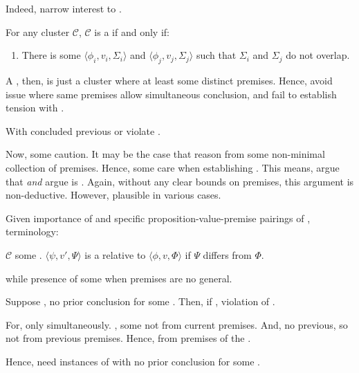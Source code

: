 \begin{note}
  Indeed, narrow interest to .

  \begin{definition}[\ragCluster{3}]
    For any cluster \(\mathcal{C}\), \(\mathcal{C}\) is a \emph{\ragCluster{}} if and only if:
    \begin{enumerate}
    \item
      There is some \(\langle \phi_{i},v_{i},\Sigma_{i} \rangle\) and \(\langle \phi_{j},v_{j},\Sigma_{j} \rangle\) such that \(\Sigma_{i}\) and \(\Sigma_{j}\) do not overlap.
    \end{enumerate}
    \vspace{-\baselineskip}
  \end{definition}

  A \ragCluster{}, then, is just a cluster where at least some distinct premises.
  Hence, avoid issue where same premises allow simultaneous conclusion, and fail to establish tension with \ESU{}.

  \begin{proposition}
    With \ragCluster{} concluded previous or violate \ESU{}.
  \end{proposition}

  Now, some caution.
  It may be the case that reason from some non-minimal collection of premises.
  Hence, some care when establishing \ragged{}.
  This means, argue that \cluster{} \emph{and} argue \cluster{} is \ragged{}.
  Again, without any clear bounds on premises, this argument is non-deductive.
  However, plausible in various cases.
\end{note}

\begin{note}
  Given importance of \ragged{} and specific proposition-value-premise pairings of \ragged{}, terminology:

  \begin{definition}
    \(\mathcal{C}\) some \ragCluster{}.
    \(\langle \psi,v',\Psi \rangle\) is a \emph{} relative to \(\langle \phi,v,\Phi \rangle\) if \(\Psi\) differs from \(\Phi\).
  \end{definition}

  \csN{} while presence of some \jag{} when premises are no general.
\end{note}

\begin{note}
  Suppose \ragged{}, no prior conclusion for some \jag{}.
  Then, if \csN{}, violation of \ESU{}.

  For, only \csN{} simultaneously.
  \jag{}, some not from current premises.
  And, no previous, so not from previous premises.
  Hence, \csN{} from premises of the \jag{}.

  Hence, need instances of \ragged{} with no prior conclusion for some \jag{}.
\end{note}

